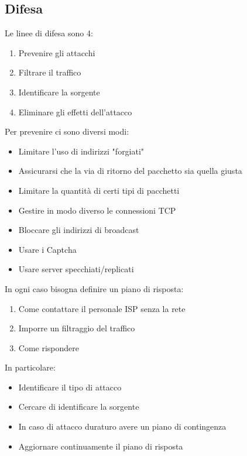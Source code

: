 \documentclass{article}
\begin{document}
\subsection{Difesa}

\noindent Le linee di difesa sono 4:
\begin{enumerate}
    \item Prevenire gli attacchi
    \item Filtrare il traffico
    \item Identificare la sorgente
    \item Eliminare gli effetti dell'attacco\newline
\end{enumerate}

\noindent Per prevenire ci sono diversi modi:
\begin{itemize}
    \item Limitare l'uso di indirizzi "forgiati"
    \item Assicurarsi che la via di ritorno del pacchetto sia quella giusta
    \item Limitare la quantità di certi tipi di pacchetti
    \item Gestire in modo diverso le connessioni TCP
    \item Bloccare gli indirizzi di broadcast
    \item Usare i Captcha
    \item Usare server specchiati/replicati\newline
\end{itemize}

\noindent In ogni caso bisogna definire un piano di risposta:
\begin{enumerate}
    \item Come contattare il personale ISP senza la rete
    \item Imporre un filtraggio del traffico
    \item Come rispondere\newline
\end{enumerate}

\noindent In particolare:
\begin{itemize}
    \item Identificare il tipo di attacco
    \item Cercare di identificare la sorgente
    \item In caso di attacco duraturo avere un piano di contingenza
    \item Aggiornare continuamente il piano di risposta\newline
\end{itemize}
\end{document}
